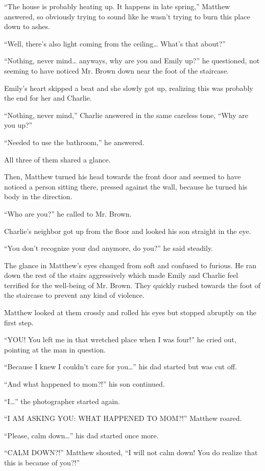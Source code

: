 “The house is probably heating up. It happens in late spring,” Matthew answered, so obviously trying to sound like he wasn’t trying to burn this place down to ashes.

“Well, there’s also light coming from the ceiling… What’s that about?”

“Nothing, never mind… anyways, why are you and Emily up?” he questioned, not seeming to have noticed Mr. Brown down near the foot of the staircase.

Emily’s heart skipped a beat and she slowly got up, realizing this was probably the end for her and Charlie.

“Nothing, never mind,” Charlie answered in the same careless tone, “Why are you up?”

“Needed to use the bathroom,” he answered.

All three of them shared a glance.

Then, Matthew turned his head towards the front door and seemed to have noticed a person sitting there, pressed against the wall, because he turned his body in the direction.

“Who are you?” he called to Mr. Brown.

Charlie’s neighbor got up from the floor and looked his son straight in the eye.

“You don’t recognize your dad anymore, do you?” he said steadily.

The glance in Matthew’s eyes changed from soft and confused to furious. He ran down the rest of the stairs aggressively which made Emily and Charlie feel terrified for the well-being of Mr. Brown. They quickly rushed towards the foot of the staircase to prevent any kind of violence.

Matthew looked at them crossly and rolled his eyes but stopped abruptly on the first step.

“YOU! You left me in that wretched place when I was four!” he cried out, pointing at the man in question.

“Because I knew I couldn’t care for you…” his dad started but was cut off.

“And what happened to mom?!” his son continued.

“I…” the photographer started again.

“I AM ASKING YOU: WHAT HAPPENED TO MOM?!” Matthew roared.

“Please, calm down…” his dad started once more.

“CALM DOWN?!” Matthew shouted, “I will not calm down! You do realize that this is because of you?!”

